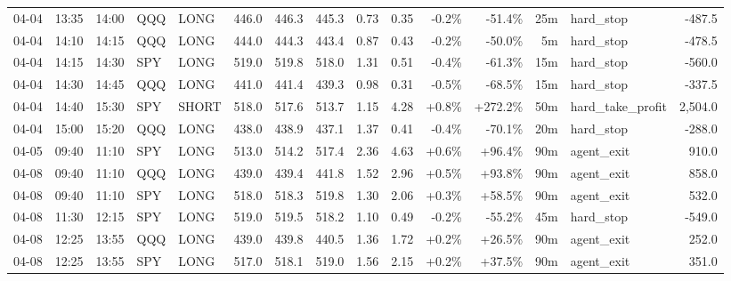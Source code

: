 \documentclass[11pt,a4paper,twoside]{article}
\begin{document}
\begin{landscape}
\begin{center}
\begin{longtable}{>{\color{txtmain}}l l l l l r r r r r r r r >{\color{txtmain}}l r}
04-04 & 13:35 & 14:00 & QQQ & LONG & 446.0 & 446.3 & 445.3 & 0.73 & 0.35 & \textcolor{lossred}{-0.2\%} & \textcolor{lossred}{-51.4\%} & 25m & hard\_stop & \textcolor{lossred}{-487.5} \\
04-04 & 14:10 & 14:15 & QQQ & LONG & 444.0 & 444.3 & 443.4 & 0.87 & 0.43 & \textcolor{lossred}{-0.2\%} & \textcolor{lossred}{-50.0\%} & 5m & hard\_stop & \textcolor{lossred}{-478.5} \\
04-04 & 14:15 & 14:30 & SPY & LONG & 519.0 & 519.8 & 518.0 & 1.31 & 0.51 & \textcolor{lossred}{-0.4\%} & \textcolor{lossred}{-61.3\%} & 15m & hard\_stop & \textcolor{lossred}{-560.0} \\
04-04 & 14:30 & 14:45 & QQQ & LONG & 441.0 & 441.4 & 439.3 & 0.98 & 0.31 & \textcolor{lossred}{-0.5\%} & \textcolor{lossred}{-68.5\%} & 15m & hard\_stop & \textcolor{lossred}{-337.5} \\
04-04 & 14:40 & 15:30 & SPY & SHORT & 518.0 & 517.6 & 513.7 & 1.15 & 4.28 & \textcolor{wingreen}{+0.8\%} & \textcolor{wingreen}{+272.2\%} & 50m & hard\_take\_profit & \textcolor{wingreen}{2,504.0} \\
04-04 & 15:00 & 15:20 & QQQ & LONG & 438.0 & 438.9 & 437.1 & 1.37 & 0.41 & \textcolor{lossred}{-0.4\%} & \textcolor{lossred}{-70.1\%} & 20m & hard\_stop & \textcolor{lossred}{-288.0} \\
04-05 & 09:40 & 11:10 & SPY & LONG & 513.0 & 514.2 & 517.4 & 2.36 & 4.63 & \textcolor{wingreen}{+0.6\%} & \textcolor{wingreen}{+96.4\%} & 90m & agent\_exit & \textcolor{wingreen}{910.0} \\
04-08 & 09:40 & 11:10 & QQQ & LONG & 439.0 & 439.4 & 441.8 & 1.52 & 2.96 & \textcolor{wingreen}{+0.5\%} & \textcolor{wingreen}{+93.8\%} & 90m & agent\_exit & \textcolor{wingreen}{858.0} \\
04-08 & 09:40 & 11:10 & SPY & LONG & 518.0 & 518.3 & 519.8 & 1.30 & 2.06 & \textcolor{wingreen}{+0.3\%} & \textcolor{wingreen}{+58.5\%} & 90m & agent\_exit & \textcolor{wingreen}{532.0} \\
04-08 & 11:30 & 12:15 & SPY & LONG & 519.0 & 519.5 & 518.2 & 1.10 & 0.49 & \textcolor{lossred}{-0.2\%} & \textcolor{lossred}{-55.2\%} & 45m & hard\_stop & \textcolor{lossred}{-549.0} \\
04-08 & 12:25 & 13:55 & QQQ & LONG & 439.0 & 439.8 & 440.5 & 1.36 & 1.72 & \textcolor{wingreen}{+0.2\%} & \textcolor{wingreen}{+26.5\%} & 90m & agent\_exit & \textcolor{wingreen}{252.0} \\
04-08 & 12:25 & 13:55 & SPY & LONG & 517.0 & 518.1 & 519.0 & 1.56 & 2.15 & \textcolor{wingreen}{+0.2\%} & \textcolor{wingreen}{+37.5\%} & 90m & agent\_exit & \textcolor{wingreen}{351.0} \\

\end{longtable}
\end{center}
\end{landscape}
\end{document}
